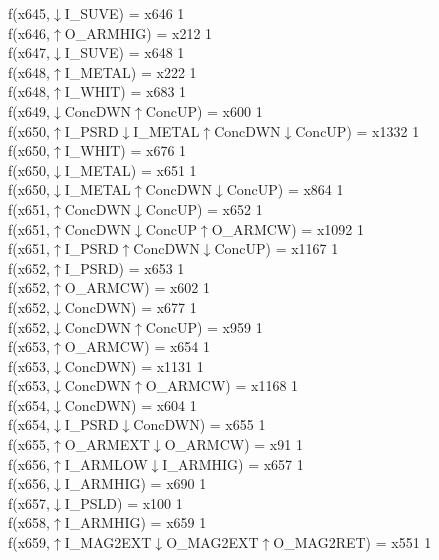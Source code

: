 f(x645,$\downarrow$I\_SUVE) = x646 {1} \\
f(x646,$\uparrow$O\_ARMHIG) = x212 {1} \\
f(x647,$\downarrow$I\_SUVE) = x648 {1} \\
f(x648,$\uparrow$I\_METAL) = x222 {1} \\
f(x648,$\uparrow$I\_WHIT) = x683 {1} \\
f(x649,$\downarrow$ConcDWN$\uparrow$ConcUP) = x600 {1} \\
f(x650,$\uparrow$I\_PSRD$\downarrow$I\_METAL$\uparrow$ConcDWN$\downarrow$ConcUP) = x1332 {1} \\
f(x650,$\uparrow$I\_WHIT) = x676 {1} \\
f(x650,$\downarrow$I\_METAL) = x651 {1} \\
f(x650,$\downarrow$I\_METAL$\uparrow$ConcDWN$\downarrow$ConcUP) = x864 {1} \\
f(x651,$\uparrow$ConcDWN$\downarrow$ConcUP) = x652 {1} \\
f(x651,$\uparrow$ConcDWN$\downarrow$ConcUP$\uparrow$O\_ARMCW) = x1092 {1} \\
f(x651,$\uparrow$I\_PSRD$\uparrow$ConcDWN$\downarrow$ConcUP) = x1167 {1} \\
f(x652,$\uparrow$I\_PSRD) = x653 {1} \\
f(x652,$\uparrow$O\_ARMCW) = x602 {1} \\
f(x652,$\downarrow$ConcDWN) = x677 {1} \\
f(x652,$\downarrow$ConcDWN$\uparrow$ConcUP) = x959 {1} \\
f(x653,$\uparrow$O\_ARMCW) = x654 {1} \\
f(x653,$\downarrow$ConcDWN) = x1131 {1} \\
f(x653,$\downarrow$ConcDWN$\uparrow$O\_ARMCW) = x1168 {1} \\
f(x654,$\downarrow$ConcDWN) = x604 {1} \\
f(x654,$\downarrow$I\_PSRD$\downarrow$ConcDWN) = x655 {1} \\
f(x655,$\uparrow$O\_ARMEXT$\downarrow$O\_ARMCW) = x91 {1} \\
f(x656,$\uparrow$I\_ARMLOW$\downarrow$I\_ARMHIG) = x657 {1} \\
f(x656,$\downarrow$I\_ARMHIG) = x690 {1} \\
f(x657,$\downarrow$I\_PSLD) = x100 {1} \\
f(x658,$\uparrow$I\_ARMHIG) = x659 {1} \\
f(x659,$\uparrow$I\_MAG2EXT$\downarrow$O\_MAG2EXT$\uparrow$O\_MAG2RET) = x551 {1} \\
